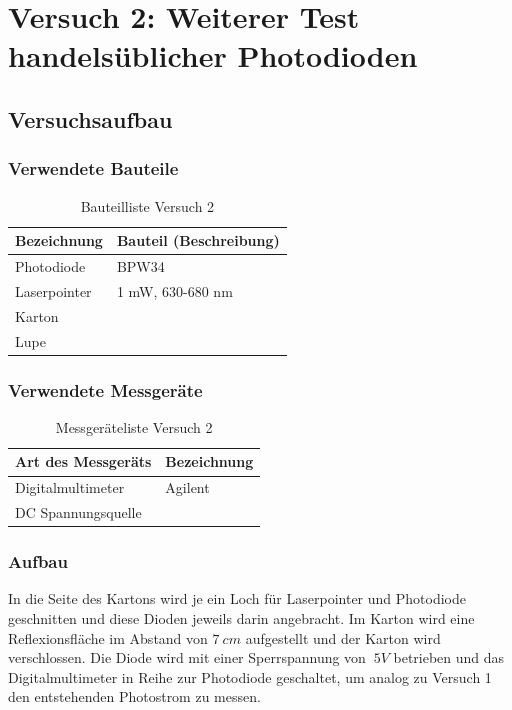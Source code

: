 \section{Versuch 2: Weiterer Test handelsüblicher Photodioden}
\subsection{Versuchsaufbau}
\subsubsection{Verwendete Bauteile}
\begin{table}[H]
	\centering
	\caption{Bauteilliste Versuch 2}
	\begin{tabular}{|l|l|}
		\hline
		\textbf{Bezeichnung} & \textbf{Bauteil (Beschreibung)}
		\\\hline
		Photodiode & BPW34
		\\\hline
		Laserpointer & 1 mW, 630-680 nm
		\\\hline
		Karton & 
		\\\hline
		Lupe &
		\\\hline
	\end{tabular}
\end{table}

\subsubsection{Verwendete Messgeräte}
\begin{table}[H]
	\centering
	\caption{Messgeräteliste Versuch 2}
	\begin{tabular}{|l|l|}
		\hline
		\textbf{Art des Messgeräts} & \textbf{Bezeichnung}
		\\\hline
		Digitalmultimeter & Agilent
		\\\hline
		DC Spannungsquelle & 
		\\\hline
	\end{tabular}
\end{table}
\subsubsection{Aufbau}
In die Seite des Kartons wird je ein Loch für Laserpointer und Photodiode geschnitten und diese Dioden jeweils darin angebracht. Im Karton wird eine Reflexionsfläche im Abstand von $7\:cm$ aufgestellt und der Karton wird verschlossen. Die Diode wird mit einer Sperrspannung von $\:5V$ betrieben und das Digitalmultimeter in Reihe zur Photodiode geschaltet, um analog zu Versuch 1 den entstehenden Photostrom zu messen. 
